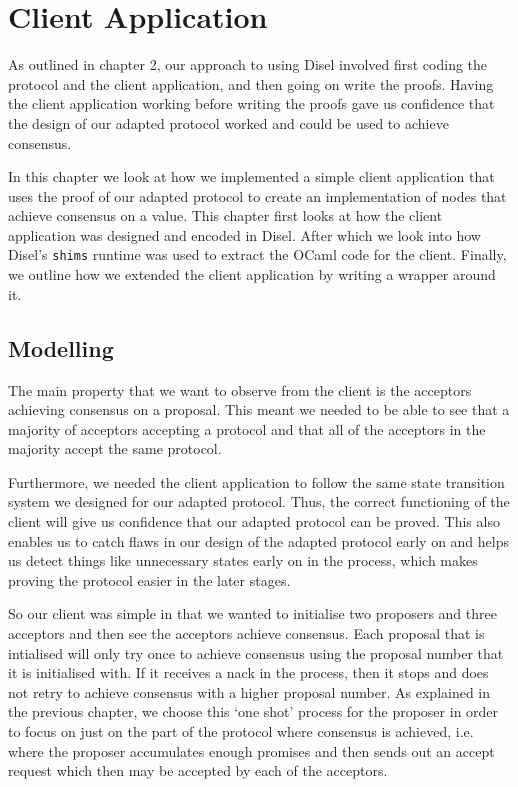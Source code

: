\chapter{Client Application}
As outlined in chapter 2, our approach to using Disel involved first coding
the protocol and the client application, and then going on write the proofs.
Having the client application working before writing the proofs gave us
confidence that the design of our adapted protocol worked and could be used
to achieve consensus.

In this chapter we look at how we implemented a simple client application
that uses the proof of our adapted protocol to create an implementation of nodes
that achieve consensus on a value. This chapter first looks at how the client
application was designed and encoded in Disel. After which we look into how
Disel's \texttt{shims} runtime was used to extract the OCaml code for the client.
Finally, we outline how we extended the client application by writing a
wrapper around it.

\section{Modelling}

The main property that we want to observe from the client is the acceptors achieving
consensus on a proposal. This meant we needed to be able to see that a majority of
acceptors accepting a protocol and that all of the acceptors in the majority
accept the same protocol.

Furthermore, we needed the client application to follow the same state transition
system we designed for our adapted protocol. Thus, the correct functioning of the
client will give us confidence that our adapted protocol can be proved. This also
enables us to catch flaws in our design of the adapted protocol early on and helps
us detect things like unnecessary states early on in the process, which makes
proving the protocol easier in the later stages.

So our client was simple in that we wanted to initialise two proposers and three
acceptors and then see the acceptors achieve consensus. Each proposal that is intialised
will only try once to achieve consensus using the proposal number that it is initialised
with. If it receives a nack in the process, then it stops and does not retry to
achieve consensus with a higher proposal number. As explained in the previous
chapter, we choose this `one shot' process for the proposer in order to focus on
just on the part of the protocol where consensus is achieved, i.e. where the proposer
accumulates enough promises and then sends out an accept request which then may
be accepted by each of the acceptors.

